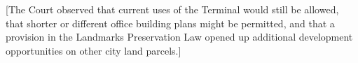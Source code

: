 [The Court observed that current uses of the Terminal would still be allowed,
that shorter or different office building plans might be permitted, and that a
provision in the Landmarks Preservation Law opened up additional development
opportunities on other city land parcels.]
%
%
%
